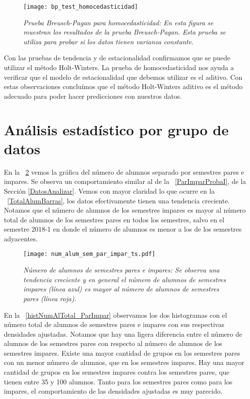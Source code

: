 \begin{figure}[H]
\centering
\texttt{[image: bp\_test\_homocedasticidad]} %
\caption[\textit{Prueba Breusch-Pagan para homocedasticidad}]{\textit{Prueba Breusch-Pagan para homocedasticidad: En esta figura se muestran los resultados de la prueba Breusch-Pagan. Esta prueba se utiliza para probar si los datos tienen varianza constante.}}\label{bpTest_homocedasticidad}
\end{figure}


Con las pruebas de tendencia y de estacionalidad confirmamos que se puede utilizar el método Holt-Winters. La prueba de homocedasticidad nos ayuda a verificar que el modelo de estacionalidad que debemos utilizar es el aditivo. Con estas observaciones concluímos que el método Holt-Winters aditivo es el método adecuado para poder hacer predicciones con nuestros datos.

\section{Análisis estadístico por grupo de datos} \label{AE_x_GpoDeDatos}

En la \figurename{~\ref{NumAlTotal_ParImpar_ts}} vemos la gráfica del número de alumnos separado por semestres pares e impares. Se observa un comportamiento similar al de la \figurename{~\ref{ParImparProbaI}}, de la Sección \ref{DatosAnalizar}. Vemos con mayor claridad lo que ocurre en la \figurename{~\ref{TotalAlumBarras}}, los datos efectivamente tienen una tendencia creciente. Notamos que el número de alumnos de los semestres impares es mayor al número total de alumnos de los semestres pares en todos los semestres, salvo en el semestre 2018-1 en donde el número de alumnos es menor a los de los semestres adyacentes.%

\begin{figure}[H]
\centering
\texttt{[image: num\_alum\_sem\_par\_impar\_ts.pdf]} %
\caption[\textit{Número de alumnos de semestres pares e impares}]{\textit{Número de alumnos de semestres pares e impares: Se observa una tendencia creciente y en general el número de alumnos de semestres impares (línea azul) es mayor al número de alumnos de semestres pares (línea roja).}}\label{NumAlTotal_ParImpar_ts}
\end{figure}


En la \figurename{~\ref{histNumAlTotal_ParImpar}} observamos los dos histogramas con el número total de alumnos de semestres pares e impares con sus respectivas densidades ajustadas. Notamos que hay una ligera diferencia entre el número de alumnos de los semestres pares con respecto al número de alumnos de los semestres impares. Existe una mayor cantidad de grupos en los semestres pares con un menor número de alumnos, que en los semestres impares. Hay una mayor cantidad de grupos en los semestres impares contra los semestres pares, que tienen entre 35 y 100 alumnos. Tanto para los semestres pares como para los impares, el comportamiento de las densidades ajustadas es muy parecido.

